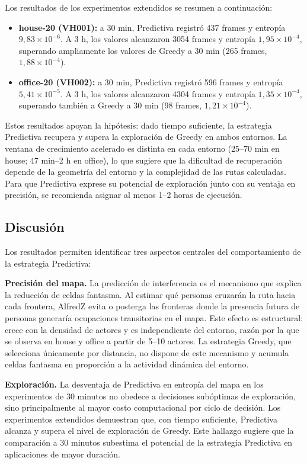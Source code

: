 Los resultados de los experimentos extendidos se resumen a continuación:

\begin{itemize}
    \item \textbf{house-20 (VH001):} a 30 min, Predictiva registró 437 frames y entropía $9{,}83 \times 10^{-6}$. A 3 h, los valores alcanzaron 3054 frames y entropía $1{,}95 \times 10^{-4}$, superando ampliamente los valores de Greedy a 30 min (265 frames, $1{,}88 \times 10^{-4}$).
    \item \textbf{office-20 (VH002):} a 30 min, Predictiva registró 596 frames y entropía $5{,}41 \times 10^{-5}$. A 3 h, los valores alcanzaron 4304 frames y entropía $1{,}35 \times 10^{-4}$, superando también a Greedy a 30 min (98 frames, $1{,}21 \times 10^{-4}$).
\end{itemize}

Estos resultados apoyan la hipótesis: dado tiempo suficiente, la estrategia Predictiva recupera y supera la exploración de Greedy en ambos entornos. La ventana de crecimiento acelerado es distinta en cada entorno (25--70 min en house; 47 min--2 h en office), lo que sugiere que la dificultad de recuperación depende de la geometría del entorno y la complejidad de las rutas calculadas. Para que Predictiva exprese su potencial de exploración junto con su ventaja en precisión, se recomienda asignar al menos 1--2 horas de ejecución.

\subsection{Discusión}

Los resultados permiten identificar tres aspectos centrales del comportamiento de la estrategia Predictiva:

\textbf{Precisión del mapa.} La predicción de interferencia es el mecanismo que explica la reducción de celdas fantasma. Al estimar qué personas cruzarán la ruta hacia cada frontera, AlfredZ evita o posterga las fronteras donde la presencia futura de personas generaría ocupaciones transitorias en el mapa. Este efecto es estructural: crece con la densidad de actores y es independiente del entorno, razón por la que se observa en house y office a partir de 5--10 actores. La estrategia Greedy, que selecciona únicamente por distancia, no dispone de este mecanismo y acumula celdas fantasma en proporción a la actividad dinámica del entorno.

\textbf{Exploración.} La desventaja de Predictiva en entropía del mapa en los experimentos de 30 minutos no obedece a decisiones subóptimas de exploración, sino principalmente al mayor costo computacional por ciclo de decisión. Los experimentos extendidos demuestran que, con tiempo suficiente, Predictiva alcanza y supera el nivel de exploración de Greedy. Este hallazgo sugiere que la comparación a 30 minutos subestima el potencial de la estrategia Predictiva en aplicaciones de mayor duración.

